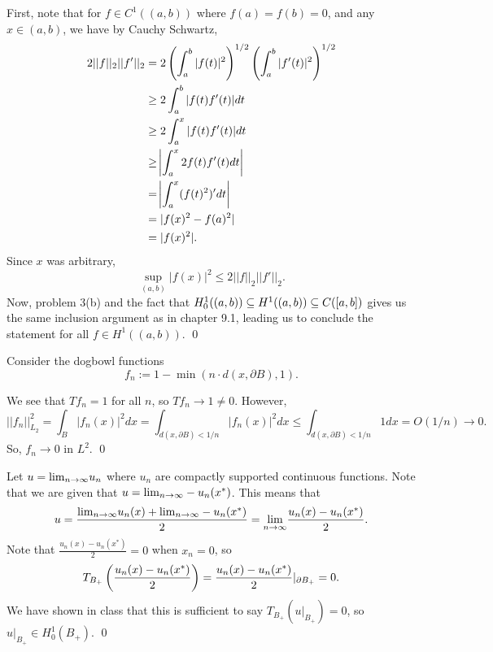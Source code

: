 \documentclass{article}
\renewcommand{\d}{\partial}
\begin{document}
\newpage
{} 
\tri
\hop 
\solution First, note that for $f \in C^1((a,b))$ where $f(a)= f(b)= 0$, and any $x \in (a,b)$, we have by Cauchy Schwartz,
\begin{align*}
    2||f||_2||f'||_2 &= 2\del{\int_a^b|f(t)|^2}^{1/2}\del{\int_a^b |f'(t)|^2}^{1/2}\\
    &\ge 2\int_a^b |f(t)f'(t)|dt \\
    &\ge 2\int_a^x |f(t)f'(t)|dt \\
    &\ge \abs{\int_a^x 2f(t)f'(t)dt} \\
    &= \abs{\int_a^x (f(t)^2)'dt} \\
    &= |f(x)^2 - f(a)^2|\\
    &= |f(x)^2|.
\end{align*}
Since $x$ was arbitrary, \[\sup_{(a,b)} |f(x)|^2 \le 2||f||_2||f'||_2.\]
Now, problem 3(b) and the fact that $H_0^1((a,b)) \subseteq H^1((a,b)) \subseteq C([a,b])$ gives us the same inclusion argument as in chapter 9.1, leading us to conclude the statement for all $f \in H^1((a,b))$. \qed

\newpage
{} 
\tri
\hop 
\solution Consider the dogbowl functions 
\[f_n := 1-\min(n\cdot d(x, \d B), 1).\]


We see that $Tf_n = 1$ for all $n$, so $Tf_n \to 1 \ne 0$. However, 
\[||f_n||_{L_2}^2 = \int_B |f_n(x)|^2dx = \int_{d(x,\d B)< 1/n} |f_n(x)|^2dx \le  \int_{d(x,\d B)< 1/n} 1 dx  = O(1/n) \to 0.\]
So, $f_n \to 0$ in $L^2$. \qed
 
\newpage
{} 
\tri
\hop 
\solution Let $u = {\lim_{n \to \infty}} u_n$ where $u_n$ are compactly supported continuous functions. Note that we are given that $u = {\lim_{n \to \infty}} -u_n(x^*)$. This means that 
\[u = \frac{ {\lim_{n \to \infty}} u_n(x) + {\lim_{n \to \infty}} -u_n(x^*)}{2}= {\lim_{n \to \infty}} \frac{u_n(x)-u_n(x^*)}{2}.\]
Note that $\frac{u_n(x)-u_n(x^*)}{2}= 0$ when $x_n =0$, so 
\[T_{B_+}\del{\frac{u_n(x)-u_n(x^*)}{2}} =\frac{u_n(x)-u_n(x^*)}{2}|_{\d B_+} = 0.\]
We have shown in class that this is sufficient to say $T_{B_+}(u|_{B_+}) = 0$, so $u|_{B_+}\in H_0^1(B_+)$. \qed
\end{document}
